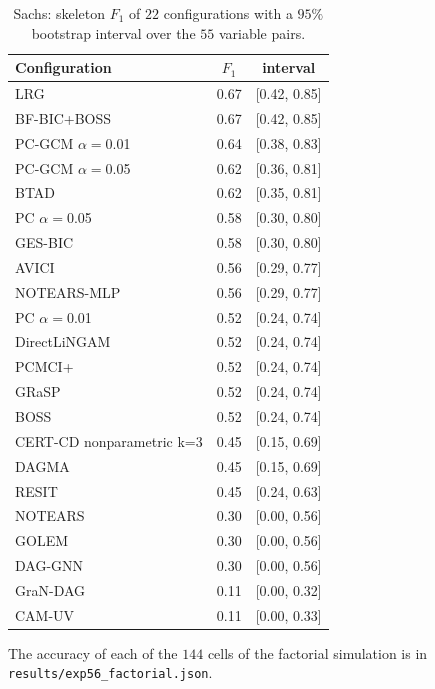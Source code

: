\begin{table}[ht]
\caption{Sachs: skeleton $F_1$ of $22$ configurations with a $95\%$ bootstrap interval over the $55$ variable pairs.}
\label{tab:sachs_ci}
\small
\begin{tabular}{@{}lcc@{}}
\toprule
Configuration & $F_1$ & interval\\
\midrule
LRG & 0.67 & [0.42, 0.85]\\
BF-BIC+BOSS & 0.67 & [0.42, 0.85]\\
PC-GCM $\alpha=$0.01 & 0.64 & [0.38, 0.83]\\
PC-GCM $\alpha=$0.05 & 0.62 & [0.36, 0.81]\\
BTAD & 0.62 & [0.35, 0.81]\\
PC $\alpha=$0.05 & 0.58 & [0.30, 0.80]\\
GES-BIC & 0.58 & [0.30, 0.80]\\
AVICI & 0.56 & [0.29, 0.77]\\
NOTEARS-MLP & 0.56 & [0.29, 0.77]\\
PC $\alpha=$0.01 & 0.52 & [0.24, 0.74]\\
DirectLiNGAM & 0.52 & [0.24, 0.74]\\
PCMCI+ & 0.52 & [0.24, 0.74]\\
GRaSP & 0.52 & [0.24, 0.74]\\
BOSS & 0.52 & [0.24, 0.74]\\
CERT-CD nonparametric k=3 & 0.45 & [0.15, 0.69]\\
DAGMA & 0.45 & [0.15, 0.69]\\
RESIT & 0.45 & [0.24, 0.63]\\
NOTEARS & 0.30 & [0.00, 0.56]\\
GOLEM & 0.30 & [0.00, 0.56]\\
DAG-GNN & 0.30 & [0.00, 0.56]\\
GraN-DAG & 0.11 & [0.00, 0.32]\\
CAM-UV & 0.11 & [0.00, 0.33]\\
\bottomrule
\end{tabular}
\end{table}

The accuracy of each of the $144$ cells of the factorial simulation is in \texttt{results/exp56\_factorial.json}.


